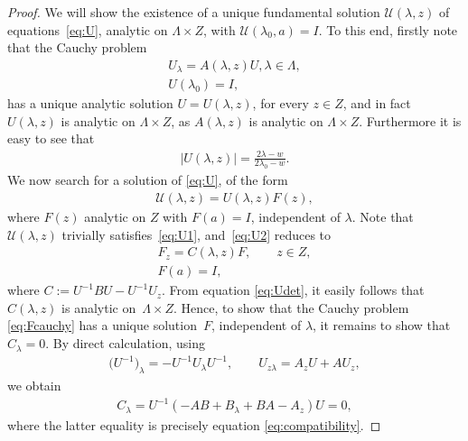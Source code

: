 \documentclass[pdftex]{sigma}
\numberwithin{equation}{section}
\begin{document}
\begin{proof}
We will show the existence of a unique fundamental solution $\mathcal{U}(\lambda,z)$ of equations~\eqref{eq:U}, analytic on $\Lambda\times Z$, with $\mathcal{U}(\lambda_0,a)=I$. To this end, f\/irstly note that the Cauchy problem
\begin{gather*}
U_\lambda=A(\lambda,z)U, \lambda\in\Lambda,\\
U(\lambda_0)=I,
\end{gather*}
has a unique analytic solution $U=U(\lambda,z)$, for every $z\in Z$, and in fact $U(\lambda,z)$ is analytic on $\Lambda\times Z$, as $A(\lambda,z)$ is analytic on $\Lambda\times Z$. Furthermore it is easy to see that
\begin{gather}\label{eq:Udet}
|U(\lambda,z)|=\frac{2\lambda-w}{2\lambda_0-w}.
\end{gather}
 We now search for a solution of \eqref{eq:U}, of the form
\begin{gather}\label{eq:mathcalU}
\mathcal{U}(\lambda,z)=U(\lambda,z)F(z),
\end{gather}
where $F(z)$ analytic on $Z$ with $F(a)=I$, independent of $\lambda$. Note that $\mathcal{U}(\lambda,z)$ trivially satis\-f\/ies~\eqref{eq:U1}, and~\eqref{eq:U2} reduces to
\begin{gather}
F_z=C(\lambda,z)F, \qquad z\in Z,\nonumber\\
F(a)=I,\label{eq:Fcauchy}
\end{gather}
where $C:=U^{-1}BU-U^{-1}U_z$. From equation \eqref{eq:Udet}, it easily follows that $C(\lambda,z)$ is analytic on~$\Lambda\times Z$. Hence, to show that the Cauchy problem \eqref{eq:Fcauchy} has a unique solution~$F$, independent of $\lambda$, it remains to show that $C_\lambda=0$. By direct calculation, using
\begin{gather*}
\big(U^{-1}\big)_\lambda=-U^{-1}U_\lambda U^{-1},\qquad U_{z\lambda}=A_zU+AU_z,
\end{gather*}
we obtain
\begin{gather*}
C_\lambda=U^{-1} (-AB+B_\lambda+BA-A_z )U=0,
\end{gather*}
where the latter equality is precisely equation \eqref{eq:compatibility}.


\end{proof}
\end{document}
